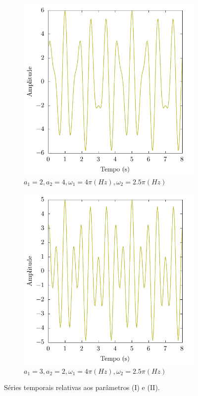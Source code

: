 \documentclass[a4paper, 11pt]{article}
\begin{document}
\begin{figure}[h!]
    \centering
    \begin{subfigure}{0.45\textwidth}
        \centering
        \includegraphics[width=\textwidth]{signal-A}
        \caption{\(a_1=2, a_2 = 4,  \omega_1 = 4\pi (Hz), \omega_2=2.5\pi(Hz)\)}
        \label{fig:subA}
    \end{subfigure}
    \begin{subfigure}{0.45\textwidth}
        \centering
        \includegraphics[width=\textwidth]{signal-B}
        \caption{\(a_1 = 3, a_2 = 2, \omega_1 = 4\pi (Hz), \omega_2 = 2.5\pi (Hz)\)}
        \label{fig:subB}
    \end{subfigure}
    \caption{Séries temporais relativas aos parâmetros (I) e (II).}
    \label{fig:sinais_1}
\end{figure}
\end{document}
